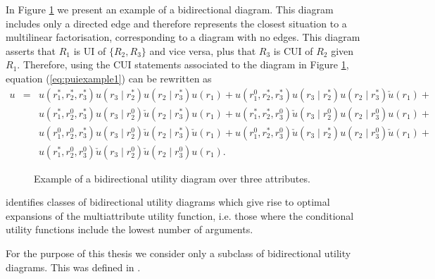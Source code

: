 \begin{example}
In Figure \ref{fig:biut} we present an example of a bidirectional diagram. This diagram includes only a directed edge and therefore represents the closest situation to a multilinear factorisation, corresponding to a diagram with no edges. This diagram asserts that $R_1$ is UI of $\{R_2,R_3\}$ and vice versa, plus that $R_3$ is CUI of $R_2$ given $R_1$. Therefore, using the CUI statements associated to the diagram in Figure \ref{fig:biut}, equation (\ref{eq:puiexample1}) can be rewritten as
\begin{eqnarray*}
u&=&u(r_1^*,r_2^*,r_3^*)u(r_3\;|\;r_2^*)u(r_2\;|\; r_3^*)u(r_1)+
u(r_1^0,r_2^*,r_3^*)u(r_3\;|\;r_2^*)u(r_2\;|\; r_3^*)\check{u}(r_1)+\nonumber\\
&&u(r_1^*,r_2^0,r_3^*)u(r_3\;|\;r_2^0)\check{u}(r_2\;|\; r_3^*)u(r_1)+
u(r_1^*,r_2^*,r_3^0)\check{u}(r_3\;|\;r_2^0)u(r_2\;|\; r_3^0)u(r_1)+\nonumber\\
&&u(r_1^0,r_2^0,r_3^*)u(r_3\;|\;r_2^0)\check{u}(r_2\;|\; r_3^*)\check{u}(r_1)+
u(r_1^0,r_2^*,r_3^0)\check{u}(r_3\;|\;r_2^*)u(r_2\;|\; r_3^0)\check{u}(r_1)+\nonumber\\
&&u(r_1^*,r_2^0,r_3^0)\check{u}(r_3\;|\;r_2^0)\check{u}(r_2\;|\; r_3^0)u(r_1).\label{eq:puiexample2}
\end{eqnarray*}
\end{example}


\begin{figure} 
\vspace{-.2cm}
\begin{center}
\end{center}
\vspace{-.4cm}
\caption{Example of a bidirectional utility diagram over three attributes. \label{fig:biut}}
\end{figure}

\citet{Abbas2010} identifies classes of bidirectional utility diagrams which give rise to optimal expansions of the multiattribute utility function, i.e. those where the conditional utility functions include the lowest number of arguments. 

For the purpose of this thesis we consider only a subclass of bidirectional utility diagrams. This was defined in \citet{Leonelli2015}.
 
